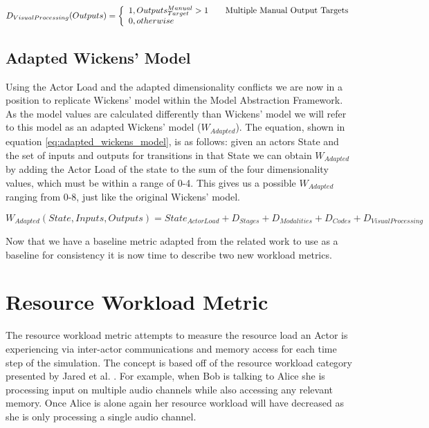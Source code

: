 \begin{equation}
D_{Visual Processing}(Outputs) = \left\{ 
  \begin{array}{l l}
    1, Outputs_{Target}^{Manual} > 1 & \quad \text{Multiple Manual Output Targets}\\
    0, otherwise
  \end{array}
  \right.
  \label{eq:focus_dimension}
\end{equation}



\subsection{Adapted Wickens' Model}
Using the Actor Load and the adapted dimensionality conflicts we are now in a position to replicate Wickens' model within the Model Abstraction Framework.  As the model values are calculated differently than Wickens' model we will refer to this model as an adapted Wickens' model ($W_{Adapted}$).  The equation, shown in equation \ref{eq:adapted_wickens_model}, is as follows: given an actors State and the set of inputs and outputs for transitions in that State we can obtain $W_{Adapted}$ by adding the Actor Load of the state to the sum of the four dimensionality values, which must be within a range of 0-4.  This gives us a possible $W_{Adapted}$ ranging from 0-8, just like the original Wickens' model.

\begin{equation}
  W_{Adapted}(State, Inputs, Outputs) = State_{Actor Load} + D_{Stages} + D_{Modalities} + D_{Codes} + D_{Visual Processing}
  \label{eq:adapted_wickens_model}
\end{equation}

Now that we have a baseline metric adapted from the related work to use as a baseline for consistency it is now time to describe two new workload metrics.

\section{Resource Workload Metric}
The resource workload metric attempts to measure the resource load an Actor is experiencing via inter-actor communications and memory access for each time step of the simulation.  The concept is based off of the resource workload category presented by Jared et al. \cite{FVHMS}.  For example, when Bob is talking to Alice she is processing input on multiple audio channels while also accessing any relevant memory.  Once Alice is alone again her resource workload will have decreased as she is only processing a single audio channel.

